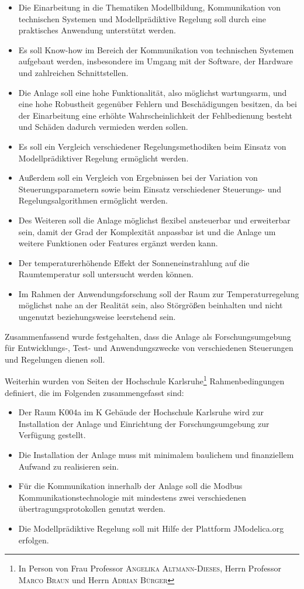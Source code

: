 \begin{itemize}
	\item Die Einarbeitung in die Thematiken Modellbildung, Kommunikation von technischen Systemen und Modellprädiktive Regelung soll durch eine praktisches Anwendung unterstützt werden.
	\item Es soll Know-how im Bereich der Kommunikation von technischen Systemen aufgebaut werden, insbesondere im Umgang mit der Software, der Hardware und zahlreichen Schnittstellen.
	\item Die Anlage soll eine hohe Funktionalität, also möglichst wartungsarm, und eine hohe Robustheit gegenüber Fehlern und Beschädigungen besitzen, da bei der Einarbeitung eine erhöhte Wahrscheinlichkeit der Fehlbedienung besteht und Schäden dadurch vermieden werden sollen.
	\item Es soll ein Vergleich verschiedener Regelungsmethodiken beim Einsatz von Modellprädiktiver Regelung ermöglicht werden.
	\item Außerdem soll ein Vergleich von Ergebnissen bei der Variation von Steuerungsparametern sowie beim Einsatz verschiedener Steuerungs- und Regelungsalgorithmen ermöglicht werden.
	\item Des Weiteren soll die Anlage möglichst flexibel ansteuerbar und erweiterbar sein, damit der Grad der Komplexität anpassbar ist und die Anlage um weitere Funktionen oder Features ergänzt werden kann.
	\item Der temperaturerhöhende Effekt der Sonneneinstrahlung auf die Raumtemperatur soll untersucht werden können.
	\item Im Rahmen der Anwendungsforschung soll der Raum zur Temperaturregelung möglichst nahe an der Realität sein, also Störgrößen beinhalten und nicht ungenutzt beziehungsweise leerstehend sein.
\end{itemize}

Zusammenfassend wurde festgehalten, dass die Anlage als Forschungsumgebung für Entwicklungs-, Test- und Anwendungszwecke von verschiedenen Steuerungen und Regelungen dienen soll.

Weiterhin wurden von Seiten der Hochschule Karlsruhe\footnote{In Person von Frau Professor \textsc{Angelika Altmann-Dieses}, Herrn Professor \textsc{Marco Braun} und Herrn \textsc{Adrian Bürger}} Rahmenbedingungen definiert, die im Folgenden zusammengefasst sind:

\begin{itemize}
	\item Der Raum K004a im K Gebäude der Hochschule Karlsruhe wird zur Installation der Anlage und Einrichtung der Forschungsumgebung zur Verfügung gestellt.
	\item Die Installation der Anlage muss mit minimalem baulichem und finanziellem Aufwand zu realisieren sein.
	\item Für die Kommunikation innerhalb der Anlage soll die Modbus Kommunikationstechnologie mit mindestens zwei verschiedenen übertragungsprotokollen genutzt werden.
	\item Die Modellprädiktive Regelung soll mit Hilfe der Plattform JModelica.org erfolgen.
\end{itemize}

